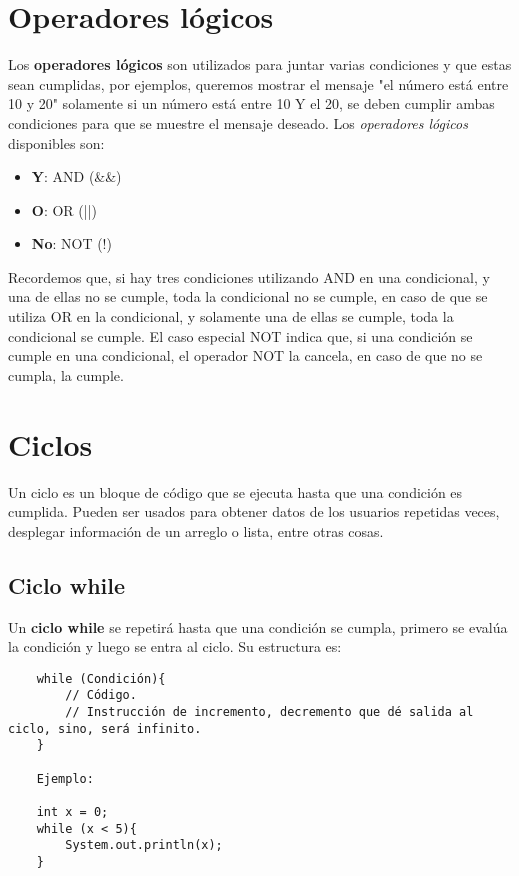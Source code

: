 \section{Operadores lógicos}

Los \textbf{operadores lógicos} son utilizados para juntar varias condiciones y que estas sean cumplidas, por ejemplos, queremos mostrar el mensaje "el número está entre 10 y 20" solamente si un número está entre 10 Y el 20, se deben cumplir ambas condiciones para que se muestre el mensaje deseado. Los \textit{operadores lógicos} disponibles son:
\begin{itemize}
    \item \textbf{Y}: AND (\&\&)
    \item \textbf{O}: OR (||)
    \item \textbf{No}: NOT (!)
\end{itemize}

Recordemos que, si hay tres condiciones utilizando AND en una condicional, y una de ellas no se cumple, toda la condicional no se cumple, en caso de que se utiliza OR en la condicional, y solamente una de ellas se cumple, toda la condicional se cumple. El caso especial NOT indica que, si una condición se cumple en una condicional, el operador NOT la cancela, en caso de que no se cumpla, la cumple.



\section{Ciclos}

Un ciclo es un bloque de código que se ejecuta hasta que una condición es cumplida. Pueden ser usados para obtener datos de los usuarios repetidas veces, desplegar información de un arreglo o lista, entre otras cosas.


\subsection{Ciclo while}

Un \textbf{ciclo while} se repetirá hasta que una condición se cumpla, primero se evalúa la condición y luego se entra al ciclo. Su estructura es:
\begin{lstlisting}
    while (Condición){
        // Código.
        // Instrucción de incremento, decremento que dé salida al ciclo, sino, será infinito.
    }
    
    Ejemplo:
    
    int x = 0;
    while (x < 5){
        System.out.println(x);
    }
\end{lstlisting}


